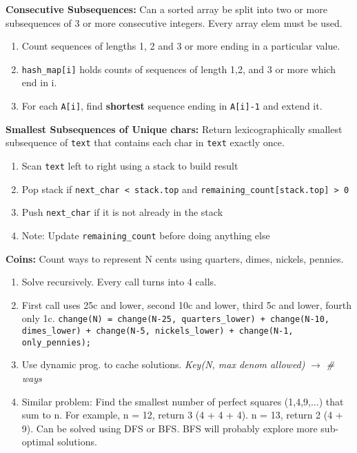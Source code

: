 \documentclass[12pt]{article}
\begin{document}
\vspace{5mm}
\noindent
\textbf{Consecutive Subsequences:} Can a sorted array be split into two or more subsequences of
3 or more consecutive integers. Every array elem must be used.
\begin{enumerate}
\item Count sequences of lengths 1, 2 and 3 or more ending in a particular value.
\item \texttt{hash\_map[i]} holds counts of sequences of length 1,2, and 3 or more which end in i.
\item For each \texttt{A[i]}, find \textbf{shortest} sequence ending in \texttt{A[i]-1} and extend it.
\end{enumerate}


\vspace{5mm}
\noindent
\textbf{Smallest Subsequences of Unique chars:} Return lexicographically smallest subsequence of \texttt{text} that contains each char in \texttt{text} exactly once.
\begin{enumerate}
\item Scan \texttt{text} left to right using a stack to build result
\item Pop stack if \texttt{next\_char < stack.top} and \texttt{remaining\_count[stack.top] > 0}
\item Push \texttt{next\_char} if it is not already in the stack
\item Note: Update \texttt{remaining\_count} before doing anything else
\end{enumerate}


\vspace{5mm}
\noindent
\textbf{Coins:}
Count ways to represent N cents using quarters, dimes, nickels, pennies.
\begin{enumerate}
\item Solve recursively. Every call turns into 4 calls.
\item First call uses 25c and lower, second 10c and lower, third 5c and lower, fourth only 1c.\newline
\texttt{change(N) = change(N-25, quarters\_lower) + change(N-10, dimes\_lower) + change(N-5, nickels\_lower) + change(N-1, only\_pennies);}
\item Use dynamic prog. to cache solutions. \emph{Key(N, max denom allowed)} $\rightarrow$ \emph{\# ways}
\item Similar problem: Find the smallest number of perfect squares (1,4,9,...) that sum to n. For example, n = 12, return 3 (4 + 4 + 4). n = 13, return 2 (4 + 9). Can be solved using DFS or BFS. BFS will probably explore more sub-optimal solutions.
\end{enumerate}
\end{document}
